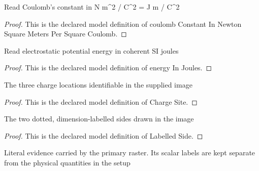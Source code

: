 \begin{definition}
  \label{def:physics:phyx-mini-0855:phyxminiproblems-problemphyxmini0855-coulombconstantinnewtonsquaremeterspersquarecoulomb}
  Read Coulomb's constant in N m\textasciicircum{}2 / C\textasciicircum{}2 = J m / C\textasciicircum{}2
\end{definition}
\begin{proof}
  This is the declared model definition of coulomb Constant In Newton Square Meters Per Square Coulomb.
\end{proof}
\begin{definition}
  \label{def:physics:phyx-mini-0855:phyxminiproblems-problemphyxmini0855-energyinjoules}
  Read electrostatic potential energy in coherent SI joules
\end{definition}
\begin{proof}
  This is the declared model definition of energy In Joules.
\end{proof}
\begin{definition}
  \label{def:physics:phyx-mini-0855:phyxminiproblems-problemphyxmini0855-chargesite}
  The three charge locations identifiable in the supplied image
\end{definition}
\begin{proof}
  This is the declared model definition of Charge Site.
\end{proof}
\begin{definition}
  \label{def:physics:phyx-mini-0855:phyxminiproblems-problemphyxmini0855-labelledside}
  The two dotted, dimension-labelled sides drawn in the image
\end{definition}
\begin{proof}
  This is the declared model definition of Labelled Side.
\end{proof}
\begin{definition}
  \label{def:physics:phyx-mini-0855:phyxminiproblems-problemphyxmini0855-threechargefigure}
  Literal evidence carried by the primary raster. Its scalar labels are kept separate from the physical quantities in the setup
\end{definition}
